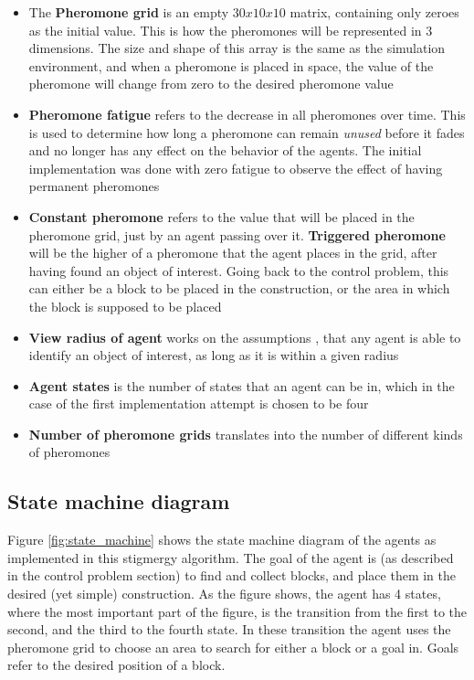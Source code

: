 \begin{itemize}
\item{The \textbf{Pheromone grid} is an empty $30x10x10$ matrix, containing only zeroes as the initial value. This is how the pheromones will be represented in 3 dimensions. The size and shape of this array is the same as the simulation environment, and when a pheromone is placed in space, the value of the pheromone will change from zero to the desired pheromone value}
\item{\textbf{Pheromone fatigue} refers to the decrease in all pheromones over time. This is used to determine how long a pheromone can remain \textit{unused} before it fades and no longer has any effect on the behavior of the agents. The initial implementation was done with zero fatigue to observe the effect of having permanent pheromones}
\item{\textbf{Constant pheromone} refers to the value that will be placed in the pheromone grid, just by an agent passing over it. \textbf{Triggered pheromone} will be the higher of a pheromone that the agent places in the grid, after having found an object of interest. Going back to the control problem, this can either be a block to be placed in the construction, or the area in which the block is supposed to be placed}
\item{\textbf{View radius of agent} works on the assumptions , that any agent is able to identify an object of interest, as long as it is within a given radius}
\item{\textbf{Agent states} is the number of states that an agent can be in, which in the case of the first implementation attempt is chosen to be four}
\item{\textbf{Number of pheromone grids} translates into the number of different kinds of pheromones }
\end{itemize}

\subsection{State machine diagram}
Figure \ref{fig:state_machine} shows the state machine diagram of the agents as implemented in this stigmergy algorithm. The goal of the agent is (as described in the control problem section) to find and collect blocks, and place them in the desired (yet simple) construction. As the figure shows, the agent has 4 states, where the most important part of the figure, is the transition from the first to the second, and the third to the fourth state. In these transition the agent uses the pheromone grid to choose an area to search for either a block or a goal in. Goals refer to the desired position of a block.

